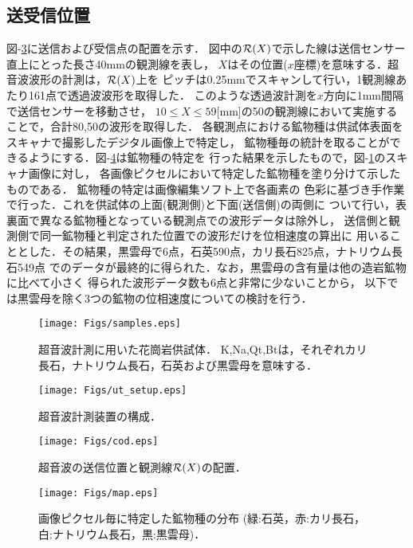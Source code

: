 \subsection{送受信位置}
図-\ref{fig:fig3}に送信および受信点の配置を示す．
図中の${\cal R}(X)$で示した線は送信センサー直上にとった長さ40mmの観測線を表し，
$X$はその位置($x$座標)を意味する．超音波波形の計測は，${\cal R}(X)$上を
ピッチは0.25mmでスキャンして行い，1観測線あたり161点で透過波波形を取得した．
このような透過波計測を$x$方向に1mm間隔で送信センサーを移動させ，
$10\leq X \leq 59$[mm]の50の観測線において実施することで，合計80,50の波形を取得した．
各観測点における鉱物種は供試体表面をスキャナで撮影したデジタル画像上で特定し，
鉱物種毎の統計を取ることができるようにする．図-\ref{fig:fig4}は鉱物種の特定を
行った結果を示したもので，図-\ref{fig:fig1}のスキャナ画像に対し，
各画像ピクセルにおいて特定した鉱物種を塗り分けて示したものである．
鉱物種の特定は画像編集ソフト上で各画素の
色彩に基づき手作業で行った．これを供試体の上面(観測側)と下面(送信側)の両側に
ついて行い，表裏面で異なる鉱物種となっている観測点での波形データは除外し，
送信側と観測側で同一鉱物種と判定された位置での波形だけを位相速度の算出に
用いることとした．その結果，黒雲母で6点，石英590点，カリ長石825点，ナトリウム長石549点
でのデータが最終的に得られた．なお，黒雲母の含有量は他の造岩鉱物に比べて小さく
得られた波形データ数も6点と非常に少ないことから，
以下では黒雲母を除く3つの鉱物の位相速度についての検討を行う．
\begin{figure}
\begin{center}
\texttt{[image: Figs/samples.eps]}
\caption{
	超音波計測に用いた花崗岩供試体．
	K,Na,Qt,Btは，それぞれカリ長石，ナトリウム長石，石英および黒雲母を意味する．
}
\label{fig:fig1}
\end{center}
	\vspace{-5mm}
\end{figure}
\begin{figure}[t]
\begin{center}
\texttt{[image: Figs/ut\_setup.eps]}
\caption{ 超音波計測装置の構成． }
\label{fig:fig2}
\end{center}
\end{figure}
\begin{figure}[t]
\begin{center}
\texttt{[image: Figs/cod.eps]}
\caption{
	超音波の送信位置と観測線${\cal R}(X)$の配置．
}
\label{fig:fig3}
\end{center}
\end{figure}
\begin{figure}[t]
\begin{center}
\texttt{[image: Figs/map.eps]}
\caption{
	画像ピクセル毎に特定した鉱物種の分布
	(緑:石英，赤:カリ長石，白:ナトリウム長石，黒:黒雲母)．
}
\label{fig:fig4}
\end{center}
\end{figure}

